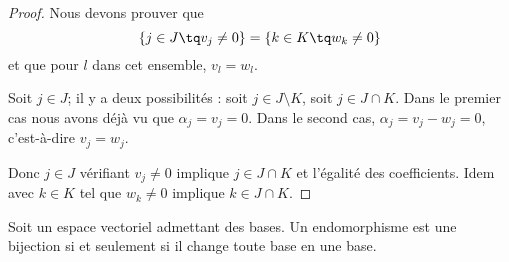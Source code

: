 \begin{proof}
	Nous devons prouver que
	\begin{equation}
		\{ j\in J \tq v_j\neq 0 \}=\{ k\in K\tq w_k\neq 0 \}
	\end{equation}
	et que pour \( l\) dans cet ensemble, \( v_l=w_l\).

	Soit \( j\in J\); il y a deux possibilités : soit \( j\in J\setminus K\), soit \( j\in J\cap K\). Dans le premier cas nous avons déjà vu que \( \alpha_j=v_j=0\). Dans le second cas, \( \alpha_j=v_j-w_j=0\), c'est-à-dire \( v_j=w_j\).

	Donc \( j\in J\) vérifiant \( v_j\neq 0\) implique \( j\in J\cap K\) et l'égalité des coefficients. Idem avec \( k\in K\) tel que \( w_k\neq 0\) implique \( k\in J\cap K\).
\end{proof}

\begin{lemma}        \label{LEMooDJSIooYcsvhO}
	Soit un espace vectoriel admettant des bases. Un endomorphisme est une bijection si et seulement si il change toute base en une base.
\end{lemma}

